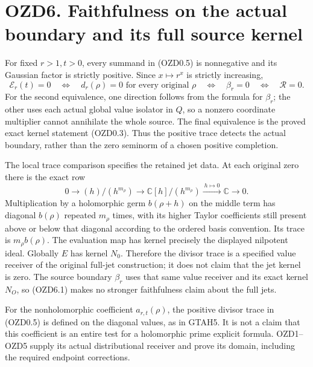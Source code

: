 \section{OZD6. Faithfulness on the actual boundary and its full source
kernel}\label{ozd6.-faithfulness-on-the-actual-boundary-and-its-full-source-kernel}

For fixed \(r>1,t>0\), every summand in (OZD0.5) is nonnegative and its
Gaussian factor is strictly positive. Since \(x\mapsto r^x\) is strictly
increasing, \[
\mathcal E_r(t)=0
\quad\Longleftrightarrow\quad
d_r(\rho)=0\text{ for every original }\rho
\quad\Longleftrightarrow\quad\beta_r=0
\quad\Longleftrightarrow\quad\mathcal R=0.
\tag{OZD6.1}
\] For the second equivalence, one direction follows from the formula
for \(\beta_r\); the other uses each actual global value isolator in
\(Q\), so a nonzero coordinate multiplier cannot annihilate the whole
source. The final equivalence is the proved exact kernel statement
(OZD0.3). Thus the positive trace detects the actual boundary, rather
than the zero seminorm of a chosen positive completion.

The local trace comparison specifies the retained jet data. At each
original zero there is the exact row \[
0\longrightarrow(h)/(h^{m_\rho})\longrightarrow
\mathbb C[h]/(h^{m_\rho})\xrightarrow{\ h\mapsto0\ }\mathbb C\longrightarrow0.
\tag{OZD6.2}
\] Multiplication by a holomorphic germ \(b(\rho+h)\) on the middle term
has diagonal \(b(\rho)\) repeated \(m_\rho\) times, with its higher
Taylor coefficients still present above or below that diagonal according
to the ordered basis convention. Its trace is \(m_\rho b(\rho)\). The
evaluation map has kernel precisely the displayed nilpotent ideal.
Globally \(E\) has kernel \(N_0\). Therefore the divisor trace is a
specified value receiver of the original full-jet construction; it does
not claim that the jet kernel is zero. The source boundary \(\beta_r\)
uses that same value receiver and its exact kernel \(N_O\), so (OZD6.1)
makes no stronger faithfulness claim about the full jets.

For the nonholomorphic coefficient \(a_{r,t}(\rho)\), the positive
divisor trace in (OZD0.5) is defined on the diagonal values, as in
GTAH5. It is not a claim that this coefficient is an entire test for a
holomorphic prime explicit formula. OZD1--OZD5 supply its actual
distributional receiver and prove its domain, including the required
endpoint corrections.


